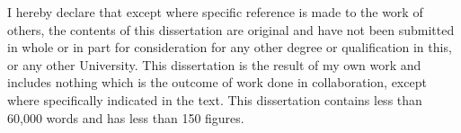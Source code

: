 
\begin{declaration}

I hereby declare that except where specific reference is made to the work of others, the contents of this dissertation are original and have not been submitted in whole or in part for consideration for any other degree or qualification in this, or any other University.
This dissertation is the result of my own work and includes nothing which is the outcome of work done in collaboration, except where specifically indicated in the text.
This dissertation contains less than 60,000 words and has less than 150 figures.


\end{declaration}

